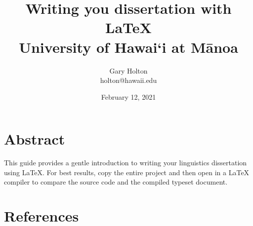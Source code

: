 \documentclass[12pt,oneside]{book}
\title{ { Writing you dissertation with \LaTeX } 
\\ {\large University of Hawai‘i at Mānoa} }
\author{ Gary Holton \\ holton@hawaii.edu}
\date{February 12, 2021}
\begin{document}
\maketitle
\frontmatter

\chapter{Abstract}
This guide provides a gentle introduction to writing your linguistics dissertation using \LaTeX. For best results, copy the entire project and then open in a {\LaTeX} compiler to compare the source code and the compiled typeset document. 





\tableofcontents
\listoffigures
\listoftables

\mainmatter





% 


\chapter*{References}




\end{document}
